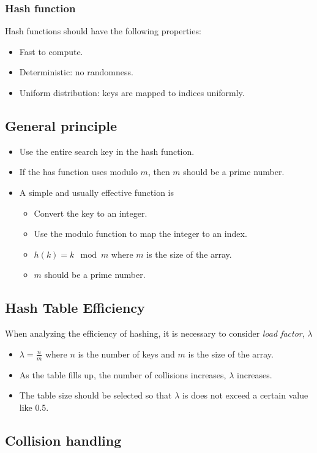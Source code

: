 \documentclass[letterpaper,12pt]{article}
\begin{document}
\subsubsection{Hash function}
Hash functions should have the following properties:\begin{itemize}
    \item Fast to compute.
    \item Deterministic: no randomness.
    \item Uniform distribution: keys are mapped to indices uniformly.
\end{itemize}
\subsection{General principle}
\begin{itemize}
    \item Use the entire search key in the hash function.
    \item If the has function uses modulo $m$, then $m$ should be a prime number.
    \item A simple and usually effective function is \begin{itemize}
        \item Convert the key to an integer.
        \item Use the modulo function to map the integer to an index.
        \item $h(k) = k \mod m$ where $m$ is the size of the array.
        \item $m$ should be a prime number.
    \end{itemize}
\end{itemize}
\subsection{Hash Table Efficiency}
When analyzing the efficiency of hashing, it is necessary to consider \textit{load factor}, $\lambda$\begin{itemize}
    \item $\lambda = \frac{n}{m}$ where $n$ is the number of keys and $m$ is the size of the array.
    \item As the table fills up, the number of collisions increases, $\lambda$ increases.
    \item The table size should be selected so that $\lambda$ is does not exceed a certain value like 0.5. 
\end{itemize}

\subsection{Collision handling}
\end{document}
